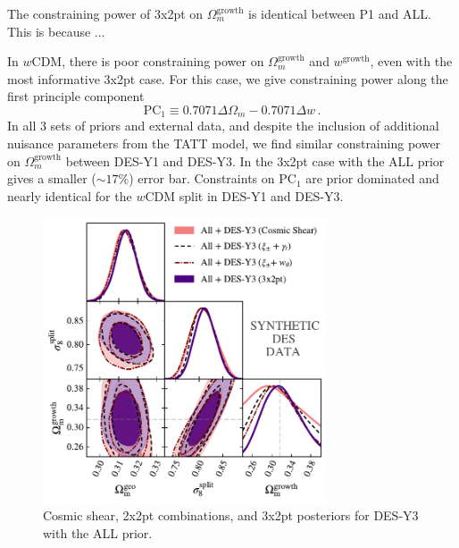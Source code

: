 The constraining power of 3x2pt on $\Omega_m^\mathrm{growth}$ is identical between P1 and ALL. This is because ...

In $w$CDM, there is poor constraining power on $\Omega_m^\mathrm{growth}$ and $w^{\mathrm{growth}}$, even with the most informative 3x2pt case. For this case, we give constraining power along the first principle component
\begin{equation}
	\mathrm{PC}_1 \equiv 0.7071\Delta\Omega_m - 0.7071\Delta w\,.
\end{equation}
In all 3 sets of priors and external data, and despite the inclusion of additional nuisance parameters from the TATT model, we find similar constraining power on $\Omega_m^\mathrm{growth}$ between DES-Y1 and DES-Y3. In the 3x2pt case with the ALL prior gives a smaller ($\sim17\%$) error bar. Constraints on $\mathrm{PC}_1$ are prior dominated and nearly identical for the $w$CDM split in DES-Y1 and DES-Y3.
\begin{figure}[ht]
	\centering
	\includegraphics[width=0.75\textwidth]{plots/plot36_S8.pdf}
	\caption{Cosmic shear, 2x2pt combinations, and 3x2pt posteriors for DES-Y3 with the ALL prior.}
	\label{fig:syn_y3_probe}
\end{figure}
